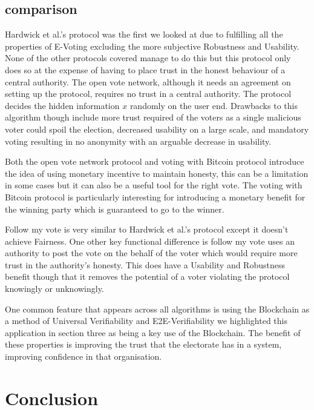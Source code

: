 \documentclass{llncs}
\begin{document}
\subsection{comparison}
Hardwick et al.'s protocol was the first we looked at due to fulfilling all the properties of E-Voting excluding the more subjective Robustness and Usability. None of the other protocols covered manage to do this but this protocol only does so at the expense of having to place trust in the honest behaviour of a central authority. The open vote network, although it needs an agreement on setting up the protocol, requires no trust in a central authority. The protocol decides the hidden information \(x\) randomly on the user end. Drawbacks to this algorithm though include more trust required of the voters as a single malicious voter could spoil the election, decreased usability on a large scale, and mandatory voting resulting in no anonymity with an arguable decrease in usability.

Both the open vote network protocol and voting with Bitcoin protocol introduce the idea of using monetary incentive to maintain honesty, this can be a limitation in some cases but it can also be a useful tool for the right vote. The voting with Bitcoin protocol is particularly interesting for introducing a monetary benefit for the winning party which is guaranteed to go to the winner.

Follow my vote is very similar to Hardwick et al.'s protocol except it doesn't achieve Fairness. One other key functional difference is follow my vote uses an authority to post the vote on the behalf of the voter which would require more trust in the authority's honesty. This does have a Usability and Robustness benefit though that it removes the potential of a voter violating the protocol knowingly or unknowingly.

One common feature that appears across all algorithms is using the Blockchain as a method of Universal Verifiability and E2E-Verifiability we highlighted this application in section three as being a key use of the Blockchain. The benefit of these properties is improving the trust that the electorate has in a system, improving confidence in that organisation.

\section{Conclusion}
\end{document}
